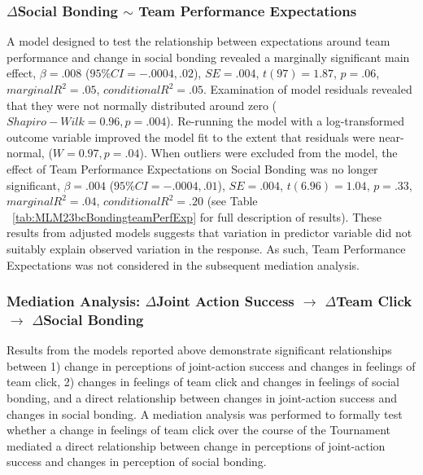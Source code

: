\documentclass[12pt]{report}
\begin{document}
{\subsubsection{$\Delta$Social Bonding $\sim$ Team Performance Expectations}
A model designed to test the relationship between expectations around team performance and change in social bonding revealed a marginally significant main effect, $\beta = .008$ ($95\% CI =  -.0004, .02$), $SE = .004$, $t(97) = 1.87$, $p = .06$, $marginal R^2 = .05$, $conditional R^2 = .05$.  Examination of model residuals revealed that they were not normally distributed around zero ($Shapiro-Wilk = 0.96, p = .004$).  Re-running the model with a log-transformed outcome variable improved the model fit to the extent that residuals were near-normal, ($W= 0.97, p = .04$). When outliers were excluded from the model, the effect of Team Performance Expectations on Social Bonding was no longer significant, $\beta = .004$ ($95\% CI =  -.0004, .01$), $SE = .004$, $t(6.96) = 1.04$, $p = .33$, $marginal R^2 = .04$, $conditional R^2 = .20$ (see Table ~\ref{tab:MLM23bcBondingteamPerfExp} for full description of results).  These results from adjusted models suggests that variation in predictor variable did not suitably explain observed variation in the response.  As such, Team Performance Expectations was not considered in the subsequent mediation analysis.


\restoregeometry



\subsubsection{Mediation Analysis: $\Delta$Joint Action Success $\rightarrow$ $\Delta$Team Click $\rightarrow$ $\Delta$Social Bonding}

Results from the models reported above demonstrate significant relationships between 1) change in perceptions of joint-action success and changes in feelings of team click, 2) changes in feelings of team click and changes in feelings of social bonding, and a direct relationship between changes in joint-action success and changes in social bonding. A mediation analysis was performed to formally test whether a change in feelings of team click over the course of the Tournament mediated a direct relationship between change in perceptions of joint-action success and changes in perception of social bonding.\\

}
\end{document}

